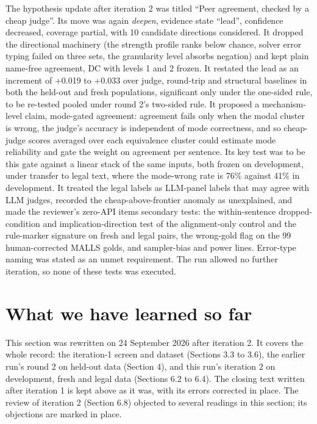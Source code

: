 \documentclass[11pt,letterpaper]{article}
\begin{document}
The hypothesis update after iteration 2 was titled ``Peer agreement, checked by a cheap judge''. Its move was again \emph{deepen}, evidence state ``lead'', confidence decreased, coverage partial, with 10 candidate directions considered. It dropped the directional machinery (the strength profile ranks below chance, solver error typing failed on three sets, the granularity level absorbs negation) and kept plain name-free agreement, DC with levels 1 and 2 frozen. It restated the lead as an increment of +0.019 to +0.033 over judge, round-trip and structural baselines in both the held-out and fresh populations, significant only under the one-sided rule, to be re-tested pooled under round 2's two-sided rule. It proposed a mechanism-level claim, mode-gated agreement: agreement fails only when the modal cluster is wrong, the judge's accuracy is independent of mode correctness, and so cheap-judge scores averaged over each equivalence cluster could estimate mode reliability and gate the weight on agreement per sentence. Its key test was to be this gate against a linear stack of the same inputs, both frozen on development, under transfer to legal text, where the mode-wrong rate is 76\% against 41\% in development. It treated the legal labels as LLM-panel labels that may agree with LLM judges, recorded the cheap-above-frontier anomaly as unexplained, and made the reviewer's zero-API items secondary tests: the within-sentence dropped-condition and implication-direction test of the alignment-only control and the rule-marker signature on fresh and legal pairs, the wrong-gold flag on the 99 human-corrected MALLS golds, and sampler-bias and power lines. Error-type naming was stated as an unmet requirement. The run allowed no further iteration, so none of these tests was executed.

\section{What we have learned so far}

This section was rewritten on 24 September 2026 after iteration 2. It covers the whole record: the iteration-1 screen and dataset (Sections 3.3 to 3.6), the earlier run's round 2 on held-out data (Section 4), and this run's iteration 2 on development, fresh and legal data (Sections 6.2 to 6.4). The closing text written after iteration 1 is kept above as it was, with its errors corrected in place. The review of iteration 2 (Section 6.8) objected to several readings in this section; its objections are marked in place.
\end{document}
